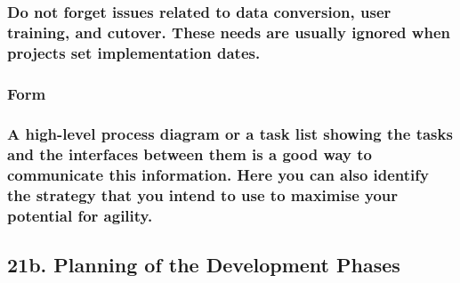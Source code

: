 \documentclass[
]{article}
\begin{document}
\hypertarget{do-not-forget-issues-related-to-data-conversion-user-training-and-cutover.-these-needs-are-usually-ignored-when-projects-set-implementation-dates.}{%
\subsubsection{\texorpdfstring{Do not forget issues related to data
conversion, user training, and cutover. These needs are usually ignored
when projects set implementation dates.
}{Do not forget issues related to data conversion, user training, and cutover. These needs are usually ignored when projects set implementation dates. }}\label{do-not-forget-issues-related-to-data-conversion-user-training-and-cutover.-these-needs-are-usually-ignored-when-projects-set-implementation-dates.}}

\hypertarget{form-33}{%
\subsubsection{Form}\label{form-33}}

\hypertarget{a-high-level-process-diagram-or-a-task-list-showing-the-tasks-and-the-interfaces-between-them-is-a-good-way-to-communicate-this-information.-here-you-can-also-identify-the-strategy-that-you-intend-to-use-to-maximise-your-potential-for-agility.}{%
\subsubsection{A high-level process diagram or a task list showing the
tasks and the interfaces between them is a good way to communicate this
information. Here you can also identify the strategy that you intend to
use to maximise your potential for
agility.}\label{a-high-level-process-diagram-or-a-task-list-showing-the-tasks-and-the-interfaces-between-them-is-a-good-way-to-communicate-this-information.-here-you-can-also-identify-the-strategy-that-you-intend-to-use-to-maximise-your-potential-for-agility.}}

\hypertarget{section-37}{%
\subsubsection{}\label{section-37}}

\hypertarget{b.-planning-of-the-development-phases}{%
\subsection{21b. Planning of the Development
Phases}\label{b.-planning-of-the-development-phases}}
\end{document}
